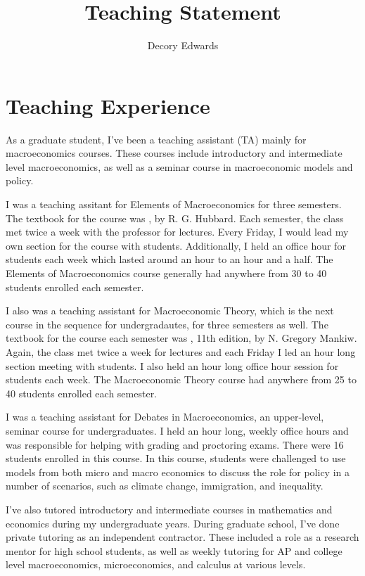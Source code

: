 \documentclass{scrartcl}
\title{Teaching Statement}
\author{Decory Edwards}
\begin{document}
\maketitle

\section{Teaching Experience}

\par As a graduate student, I've been a teaching assistant (TA) mainly for macroeconomics courses. These courses include introductory and intermediate level macroeconomics, as well as a seminar course in macroeconomic models and policy.

\par I was a teaching assitant for Elements of Macroeconomics for three semesters. The textbook for the course was , by R. G. Hubbard. Each semester, the class met twice a week with the professor for lectures. Every Friday, I would lead my own section for the course with students. Additionally, I held an office hour for students each week which lasted around an hour to an hour and a half. The Elements of Macroeconomics course generally had anywhere from 30 to 40 students enrolled each semester.

\par I also was a teaching assistant for Macroeconomic Theory, which is the next course in the sequence for undergradautes, for three semesters as well. The textbook for the course each semester was , 11th edition, by N. Gregory Mankiw. Again, the class met twice a week for lectures and each Friday I led an hour long section meeting with students. I also held an hour long office hour session for students each week. The Macroeconomic Theory course had anywhere from 25 to 40 students enrolled each semester.

\par I was a teaching assistant for Debates in Macroeconomics, an upper-level, seminar course for undergraduates. I held an hour long, weekly office hours and was responsible for helping with grading and proctoring exams. There were 16 students enrolled in this course. In this course, students were challenged to use models from both micro and macro economics to discuss the role for policy in a number of scenarios, such as climate change, immigration, and inequality. 

\par I've also tutored introductory and intermediate courses in mathematics and economics during my undergraduate years. During graduate school, I've done private tutoring as an independent contractor. These included a role as a research mentor for high school students, as well as weekly tutoring for AP and college level macroeconomics, microeconomics, and calculus at various levels.
\end{document}
